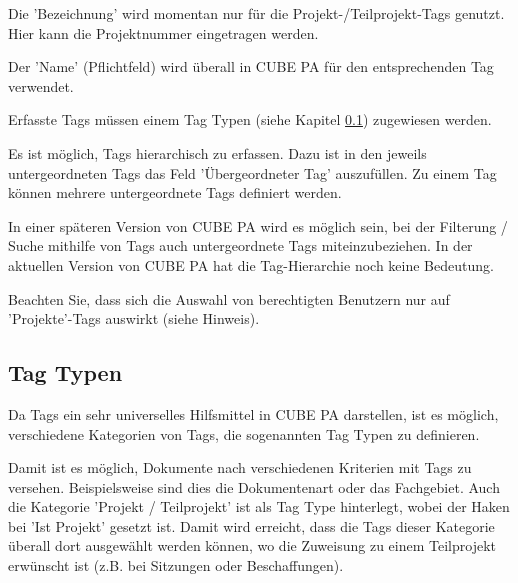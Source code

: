 Die 'Bezeichnung' wird momentan nur für die Projekt-/Teilprojekt-Tags genutzt. Hier kann die Projektnummer eingetragen werden.

\vspace{\baselineskip}

Der 'Name' (Pflichtfeld) wird überall in CUBE PA für den entsprechenden Tag verwendet.

\vspace{\baselineskip}

Erfasste Tags müssen einem Tag Typen (siehe Kapitel \ref{bkm:Ref444100222}) zugewiesen werden.

\vspace{\baselineskip}

Es ist möglich, Tags hierarchisch zu erfassen. Dazu ist in den jeweils untergeordneten Tags das Feld 'Übergeordneter Tag' auszufüllen. Zu einem Tag können mehrere untergeordnete Tags definiert werden.

\vspace{\baselineskip}

In einer späteren Version von CUBE PA wird es möglich sein, bei der Filterung / Suche mithilfe von Tags auch untergeordnete Tags miteinzubeziehen. In der aktuellen Version von CUBE PA hat die Tag-Hierarchie noch keine Bedeutung.

\vspace{\baselineskip}

Beachten Sie, dass sich die Auswahl von berechtigten Benutzern nur auf 'Projekte'-Tags auswirkt (siehe Hinweis).

\subsection{Tag Typen}
\label{bkm:Ref444100222}
Da Tags ein sehr universelles Hilfsmittel in CUBE PA darstellen, ist es möglich, verschiedene Kategorien von Tags, die sogenannten Tag Typen zu definieren. \newline

Damit ist es möglich, Dokumente nach verschiedenen Kriterien mit Tags zu versehen. Beispielsweise sind dies die Dokumentenart oder das Fachgebiet. Auch die Kategorie 'Projekt / Teilprojekt' ist als Tag Type hinterlegt, wobei der Haken bei 'Ist Projekt' gesetzt ist. Damit wird erreicht, dass die Tags dieser Kategorie überall dort ausgewählt werden können, wo die Zuweisung zu einem Teilprojekt erwünscht ist (z.B. bei Sitzungen oder Beschaffungen). \newline

